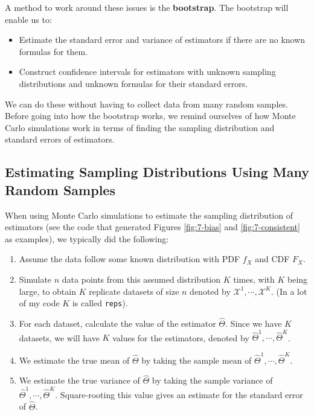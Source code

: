 \documentclass[
]{book}
\begin{document}
A method to work around these issues is the \textbf{bootstrap}. The bootstrap will enable us to:

\begin{itemize}
\item
  Estimate the standard error and variance of estimators if there are no known formulas for them.
\item
  Construct confidence intervals for estimators with unknown sampling distributions and unknown formulas for their standard errors.
\end{itemize}

We can do these without having to collect data from many random samples. Before going into how the bootstrap works, we remind ourselves of how Monte Carlo simulations work in terms of finding the sampling distribution and standard errors of estimators.

\hypertarget{estimating-sampling-distributions-using-many-random-samples}{%
\subsection{Estimating Sampling Distributions Using Many Random Samples}\label{estimating-sampling-distributions-using-many-random-samples}}

When using Monte Carlo simulations to estimate the sampling distribution of estimators (see the code that generated Figures \ref{fig:7-bias} and \ref{fig:7-consistent} as examples), we typically did the following:

\begin{enumerate}
\def\labelenumi{\arabic{enumi}.}
\item
  Assume the data follow some known distribution with PDF \(f_X\) and CDF \(F_X\).
\item
  Simulate \(n\) data points from this assumed distribution \(K\) times, with \(K\) being large, to obtain \(K\) replicate datasets of size \(n\) denoted by \(\mathcal{X}^{1}, \cdots, \mathcal{X}^{K}\). (In a lot of my code \(K\) is called \texttt{reps}).
\item
  For each dataset, calculate the value of the estimator \(\hat{\Theta}\). Since we have \(K\) datasets, we will have \(K\) values for the estimators, denoted by \(\hat{\Theta}^{1}, \cdots, \hat{\Theta}^{K}\).
\item
  We estimate the true mean of \(\hat{\Theta}\) by taking the sample mean of \(\hat{\Theta}^{1}, \cdots, \hat{\Theta}^{K}\).
\item
  We estimate the true variance of \(\hat{\Theta}\) by taking the sample variance of \(\hat{\Theta}^{1}, \cdots, \hat{\Theta}^{K}\). Square-rooting this value gives an estimate for the standard error of \(\hat{\Theta}\).
\end{enumerate}
\end{document}
